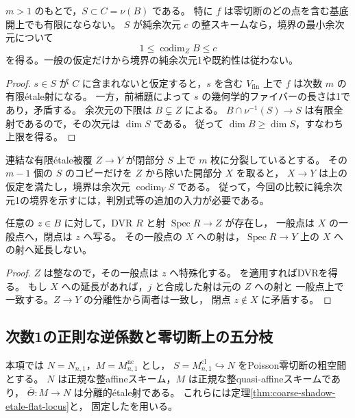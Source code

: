 \begin{proposition}[全可換点の上にある欠落枝]
\label{prop:boundary-over-zero}
$m>1$ のもとで，$S\subset C=\nu(B)$ である。
特に $f$ は零切断のどの点を含む基底開上でも有限にならない。
$S$ が純余次元 $c$ の整スキームなら，境界の最小余次元について
\[
 1\le\operatorname{codim}_Z B\le c
\]
を得る。一般の仮定だけから境界の純余次元1や既約性は従わない。
\end{proposition}
\begin{proof}
$s\in S$ が $C$ に含まれないと仮定すると，$s$ を含む $V_{\mathrm{fin}}$ 上で
$f$ は次数 $m$ の有限\'{e}tale射になる。
一方，前補題によって $s$ の幾何学的ファイバーの長さは1であり，矛盾する。
余次元の下限は $B\subsetneq Z$ による。
$B\cap\nu^{-1}(S)\to S$ は有限全射であるので，その次元は $\dim S$ である。
従って $\dim B\ge\dim S$，すなわち上限を得る。
\end{proof}

\begin{remark}[高余次元境界が可能な理由]
連結な有限\'{e}tale被覆 $Z\to Y$ が閉部分 $S$ 上で $m$ 枚に分裂しているとする。
その $m-1$ 個の $S$ のコピーだけを $Z$ から除いた開部分 $X$ を取ると，
$X\to Y$ は上の仮定を満たし，境界は余次元 $\operatorname{codim}_Y S$ である。
従って，今回の比較に純余次元1の境界を示すには，判別式等の追加の入力が必要である。
\end{remark}

\begin{proposition}[境界点は実際の開部分の特殊化である]
\label{prop:boundary-valuative-specialization}
任意の $z\in B$ に対して，DVR $R$ と射 $\operatorname{Spec}R\to Z$ が存在し，
一般点は $X$ の一般点へ，閉点は $z$ へ写る。
その一般点の $X$ への射は，$\operatorname{Spec}R\to Y$ 上の $X$ への射へ延長しない。
\end{proposition}
\begin{proof}
$Z$ は整なので，その一般点は $z$ へ特殊化する。
\cite[Tag 054F]{StacksProject}を適用すればDVRを得る。
もし $X$ への延長があれば，$j$ と合成した射は元の $Z$ への射と
一般点上で一致する。$Z\to Y$ の分離性から両者は一致し，
閉点 $z\notin X$ に矛盾する。
\end{proof}

\subsection{次数1の正則な逆係数と零切断上の五分枝}
\label{subsec:degree-one-normalization-zero}

本項では $N=N_{n,1}$，$M=M^{\mathrm{nc}}_{n,1}$ とし，
$S=M^{\mathrm{cl}}_{n,1}\hookrightarrow N$ をPoisson零切断の粗空間とする。
$N$ は正規な整affineスキーム，$M$ は正規な整quasi-affineスキームであり，
$\overline\Theta:M\to N$ は分離的\'{e}tale射である。
これらには定理\ref{thm:coarse-shadow-etale-flat-locus}と，
固定した\cite[定理9.2]{PoissonDP}を用いる。

